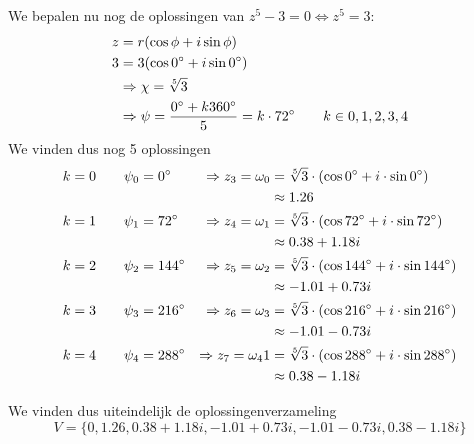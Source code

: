 \documentclass[12pt,twoside,a4paper]{article}
\begin{document}
We bepalen nu nog de oplossingen van $z^5 - 3 = 0 \Leftrightarrow z^5 = 3$:
\begin{align*}
  z &= r(\cos\phi + i\sin\phi)\\
  3 &= 3(\cos0^\circ + i\sin0^\circ)\\
    &\Rightarrow \chi = \sqrt[5]{3}\\
    &\Rightarrow \psi = \dfrac{ 0^\circ +  k360^\circ }{ 5 } = k\cdot72^\circ \qquad k\in{0, 1, 2, 3, 4}
\end{align*}
We vinden dus nog 5 oplossingen
\begin{align*}
  k=0 \qquad \psi_0 &= 0^\circ   &\Rightarrow z_3=\omega_0 &= \sqrt[5]{3} \cdot (\cos 0^\circ + i \cdot \sin 0^\circ)\\
            &             &           &\approx 1.26\\
  k=1 \qquad \psi_1 &= 72^\circ  &\Rightarrow z_4=\omega_1 &= \sqrt[5]{3} \cdot (\cos 72^\circ + i \cdot \sin 72^\circ)\\
            &             &           &\approx 0.38 + 1.18i\\
  k=2 \qquad \psi_2 &= 144^\circ &\Rightarrow z_5=\omega_2 &= \sqrt[5]{3} \cdot (\cos 144^\circ + i \cdot \sin 144^\circ)\\
            &             &           &\approx -1.01 + 0.73i\\
  k=3 \qquad \psi_3 &= 216^\circ &\Rightarrow z_6=\omega_3 &= \sqrt[5]{3} \cdot (\cos 216^\circ + i \cdot \sin 216^\circ)\\
            &             &           &\approx -1.01 - 0.73i\\
  k=4 \qquad \psi_4 &= 288^\circ &\Rightarrow z_7=\omega_41 &= \sqrt[5]{3} \cdot (\cos 288^\circ + i \cdot \sin 288^\circ)\\
            &             &           &\approx 0.38 - 1.18i\\
\end{align*}

We vinden dus uiteindelijk de oplossingenverzameling
\[V=\{0, 1.26, 0.38 + 1.18i, -1.01 + 0.73i, -1.01 - 0.73i, 0.38 - 1.18i\}\]
\end{document}
